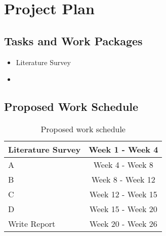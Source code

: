 \section{Project Plan}
\subsection{Tasks and Work Packages}
\begin{itemize}
\item Literature Survey 
\item 
\end{itemize}
\subsection{Proposed Work Schedule}
\begin{table}[H]
\centering
\label{tbl:work_schedule}
\caption{Proposed work schedule}
\begin{tabular}{|l|c|}
\hline
Literature Survey & Week 1 - Week 4\\
\hline
A & Week 4 - Week 8\\
\hline
B & Week 8 - Week 12 \\
\hline
C & Week 12 - Week 15 \\
\hline
D & Week 15 - Week 20 \\
\hline
Write Report & Week 20 - Week 26 \\
\hline
\end{tabular}
\end{table}